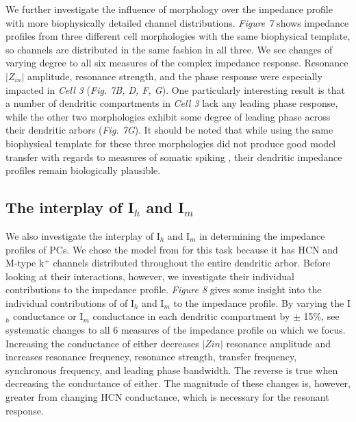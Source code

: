 \documentclass[utf8]{frontiersSCNS} %
\begin{document}
We further investigate the influence of morphology over the impedance profile with more biophysically
detailed channel distributions.
\emph{Figure 7} shows impedance profiles from three different cell morphologies with the same biophysical template, so channels are
distributed in the same fashion in all three.
We see changes of varying degree to all six measures of the complex impedance response.
Resonance $|Z_{in}|$ amplitude, resonance strength, and the phase response were especially impacted in \emph{Cell 3} (\emph{Fig. 7B, D, F, G}).
One particularly interesting result is that a number of dendritic compartments in \emph{Cell 3} lack any leading phase response, 
while the other two morphologies exhibit some degree of leading phase across their dendritic arbors (\emph{Fig. 7G}).
It should be noted that while using the same biophysical template for these three morphologies did not produce
good model transfer with regards to measures of somatic spiking \citep{Hay2011-if},
their dendritic impedance profiles remain biologically plausible.

\subsection{The interplay of I$_h$ and I$_m$}
We also investigate the interplay of I$_h$ and I$_m$ in determining the impedance profiles of PCs.
We chose the model from \cite{Kole2008-aj} for this task because it has HCN and M-type k$^+$ channels distributed
throughout the entire dendritic arbor.
Before looking at their interactions, however, we investigate their individual contributions to the impedance profile.
\emph{Figure 8} gives some insight into the individual contributions of of I$_h$ and I$_m$ to the impedance profile.
By varying the I$_h$ conductance or I$_m$ conductance in each dendritic compartment by $\pm$ 15\%, see systematic 
changes to all 6 measures of the impedance profile on which we focus.  Increasing the conductance of either decreases
$|Zin|$ resonance amplitude and increases resonance frequency, resonance strength, transfer frequency, synchronous
frequency, and leading phase bandwidth.
The reverse is true when decreasing the conductance of either.
The magnitude of these changes is, however, greater from changing HCN conductance, which is necessary for the resonant response.
\end{document}
